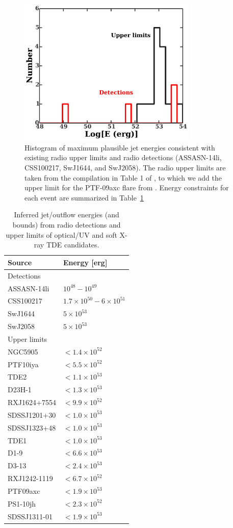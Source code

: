 \documentclass[usenatbib,fleqn]{mnras}
\begin{document}
\begin{figure}
\includegraphics[width=8.5cm]{hist.pdf}
\caption{\label{fig:hist} Histogram of maximum plausible jet energies
  consistent with existing radio upper limits and radio detections
  (ASSASN-14li, CSS100217, SwJ1644, and SwJ2058). The radio upper
  limits are taken from the compilation in Table 1 of
  \citet{Mimica+2015}, to which we add the upper limit for the
  PTF-09axc flare from \citet{Arcavi+2014}. Energy constraints for
  each event are summarized in Table~\ref{tab:enConstr}}
\end{figure}

\begin{table}
  \caption{\label{tab:enConstr} Inferred jet/outflow energies (and bounds) from radio detections and upper limits of optical/UV
    and soft X-ray TDE candidates.}
\begin{tabular*}{0.95\columnwidth}{ll}
Source & Energy [erg] \\
\hline\hline
Detections &\\
ASSASN-14li & $10^{48}-10^{49}$\\
CSS100217 & $1.7\times 10^{50}-6\times 10^{51}$\\
SwJ1644 & $5\times 10^{53}$\\
SwJ2058 & $5\times 10^{53}$\\ 
\hline 
Upper limits & \\
\hline
NGC5905 & $< 1.4 \times 10^{ 52 }$ \\
PTF10iya & $< 5.5 \times 10^{ 52 }$ \\
TDE2 & $< 1.1 \times 10^{ 53 }$ \\
D23H-1 & $< 1.3 \times 10^{ 53 }$ \\
RXJ1624+7554 & $< 9.9 \times 10^{ 52 }$ \\
SDSSJ1201+30 & $< 1.0 \times 10^{ 53 }$ \\
SDSSJ1323+48 & $< 1.0 \times 10^{ 53 }$ \\
TDE1 & $< 1.0 \times 10^{ 53 }$ \\
D1-9 & $< 6.6 \times 10^{ 53 }$ \\
D3-13 & $< 2.4 \times 10^{ 53 }$ \\
RXJ1242-1119 & $< 6.7 \times 10^{ 52 }$ \\
PTF09axc & $< 1.9 \times 10^{ 53 }$ \\
PS1-10jh & $< 2.3 \times 10^{ 52 }$ \\
SDSSJ1311-01 & $< 1.9 \times 10^{ 53 }$ \\
\end{tabular*}
\end{table}
\end{document}
